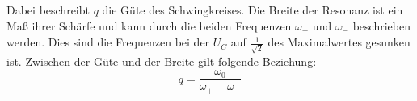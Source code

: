 Dabei beschreibt $q$ die Güte des Schwingkreises.
Die Breite der Resonanz ist ein Maß ihrer Schärfe und kann durch die beiden Frequenzen $\omega_+$ und $\omega_-$ beschrieben werden. Dies sind
die Frequenzen bei der $U_C$ auf $\frac{1}{\sqrt{2}}$ des Maximalwertes gesunken ist. Zwischen der Güte und
der Breite gilt folgende Beziehung:
\begin{equation}
  q = \frac{\omega_0}{\omega_+ - \omega_-}
\end{equation}
